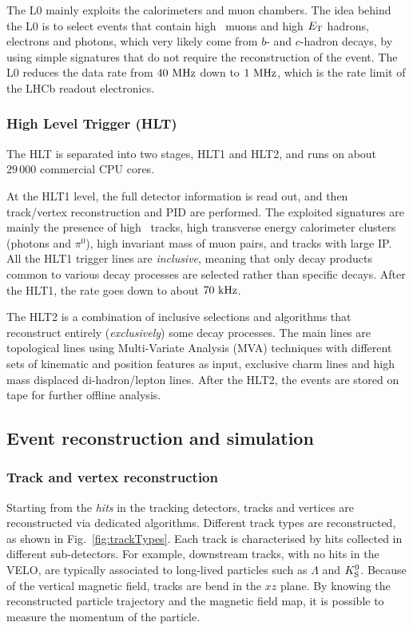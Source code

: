 The L0 mainly exploits the calorimeters and muon chambers. The idea behind the L0 is to select events that contain high \pt~muons and high $E_{\rm T}$ hadrons, electrons and photons, which very likely come from $b$- and $c$-hadron decays, by using simple signatures that do not require the reconstruction of the event.
The L0 reduces the data rate from $40~\rm MHz$ down to $1~\rm MHz$, which is the rate limit of the LHCb readout electronics.

\subsubsection*{High Level Trigger (HLT)}

The HLT is separated into two stages, HLT1 and HLT2, and runs on about $29\,000$ commercial CPU cores. 

At the HLT1 level, the full detector information is read out, and then track/vertex reconstruction and PID are performed. The exploited signatures are mainly the presence of high \pt~tracks, high transverse energy calorimeter clusters (photons and $\pi^0$), high invariant mass of muon pairs, and tracks with large IP. All the HLT1 trigger lines are \emph{inclusive}, meaning that only decay products common to various decay processes are selected rather than specific decays. After the HLT1, the rate goes down to about $70~\rm kHz$.

The HLT2 is a combination of inclusive selections and algorithms that reconstruct entirely (\emph{exclusively}) some decay processes. The main lines are topological lines using Multi-Variate Analysis (MVA) techniques with different sets of kinematic and position features as input, exclusive charm lines and high mass displaced di-hadron/lepton lines. After the HLT2, the events are stored on tape for further offline analysis.

\subsection{Event reconstruction and simulation}

\subsubsection*{Track and vertex reconstruction}

Starting from the \emph{hits} in the tracking detectors, tracks and vertices are reconstructed via dedicated algorithms. 
Different track types are reconstructed, as shown in Fig.~\ref{fig:trackTypes}. Each track is characterised by hits collected in different sub-detectors. For example, downstream tracks, with no hits in the VELO,
are typically associated to long-lived particles such as $\Lambda$ and $K^0_{\rm S}$. Because of the vertical magnetic field, tracks are bend in the $xz$ plane. By knowing the reconstructed particle trajectory and 
the magnetic field map, it is possible to measure the momentum of the particle.

